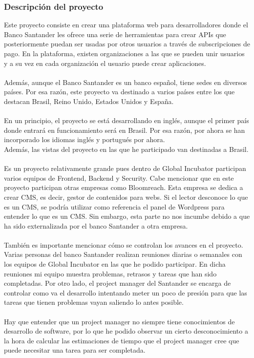 \documentclass[a4paper,12pt]{article}
\begin{document}
\subsubsection{Descripción del proyecto}

Este proyecto consiste en crear una plataforma web para desarrolladores donde el Banco Santander les ofrece una serie de herramientas para crear APIs que posteriormente puedan ser usadas por otros usuarios a través de subscripciones de pago. En la plataforma, existen organizaciones a las que se pueden unir usuarios y a su vez en cada organización el usuario puede crear aplicaciones.\\
\\
Además, aunque el Banco Santander es un banco español, tiene sedes en diversos países. Por esa razón, este proyecto va destinado a varios países entre los que destacan Brasil, Reino Unido, Estados Unidos y España.\\
\\
En un principio, el proyecto se está desarrollando en inglés, aunque el primer país donde entrará en funcionamiento será en Brasil. Por esa razón, por ahora se han incorporado los idiomas inglés y portugués por ahora. \\
Además, las vistas del proyecto en las que he participado van destinadas a Brasil.\\
\\
Es un proyecto relativamente grande pues dentro de Global Incubator participan varios equipos de Frontend, Backend y Security. Cabe mencionar que en este proyecto participan otras empresas como Bloomreach. Esta empresa se dedica a crear CMS, es decir, gestor de contenidos para webs. Si el lector desconoce lo que es un CMS, se podría utilizar como referencia el panel de Wordpress para entender lo que es un CMS. Sin embargo, esta parte no nos incumbe debido a que ha sido externalizada por el banco Santander a otra empresa.\\
\\
También es importante mencionar cómo se controlan los avances en el proyecto. Varias personas del banco Santander realizan reuniones diarias o semanales con los equipos de Global Incubator en las que he podido participar. En dicha reuniones mi equipo muestra problemas, retrasos y tareas que han sido completadas. Por otro lado, el project manager del Santander se encarga de controlar como va el desarrollo intentando meter un poco de presión para que las tareas que tienen problemas vayan saliendo lo antes posible.\\
\\
Hay que entender que un project manager no siempre tiene conocimientos de desarrollo de software, por lo que he podido observar un cierto desconocimiento a la hora de calcular las estimaciones de tiempo que el project manager cree que puede necesitar una tarea para ser completada.\\
\end{document}
